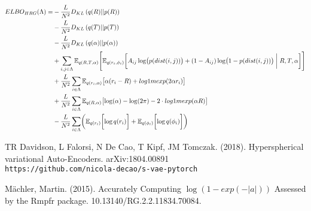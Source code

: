 \documentclass{article}
\newcommand{\E}{\mathbb{E}}
\begin{document}
\begin{equation}
\begin{split}
ELBO_{HRG}(\Lambda) = &- \frac{L}{N^2} D_{KL} \left(q(R)||p(R)\right)\\
\quad &- \frac{L}{N^2} D_{KL} \left(q(T)||p(T)\right)\\
\quad &- \frac{L}{N^2} D_{KL} \left(q(\alpha)||p(\alpha)\right)\\
\quad & + \sum_{i,j \in \Lambda }\E_{q( R,T,\alpha)} \Biggl[ 
\E_{q(r_i, \phi_i)} \biggl[ 
A_{ij} \log \bigl(p(dist(i,j))\bigr) + (1-A_{ij}) \log \bigl(1 - p(dist(i,j))\bigr)  \biggm\vert R,T,\alpha \biggr] \Biggr]\\
\quad &+ \frac{L}{N^2} \sum_{i \in \Lambda} \E_{q(r_i, \alpha)} \bigl[ \alpha (r_i-R) + log1mexp (2 \alpha r_i) \bigr]\\
\quad &+ \frac{L}{N^2} \sum_{i \in \Lambda} \E_{q(R, \alpha)} \bigl[ \log( \alpha ) - \log(2\pi) - 2\cdot log1mexp (\alpha R) \bigr]\\
\quad &- \frac{L}{N^2} \sum_{i \in \Lambda} \biggl(\E_{q(r_i)} \biggl[\log q(r_i) \biggr] + \E_{q(\phi_i)} \biggl[\log q(\phi_i) \biggr] \biggr) 
\end{split}
\end{equation} 

\begin{thebibliography}{}
	TR Davidson, L Falorsi, N De Cao, T Kipf, JM Tomczak. (2018). Hyperspherical variational Auto-Encoders. arXiv:1804.00891 \\
	\texttt{https://github.com/nicola-decao/s-vae-pytorch}
	
	M\"achler, Martin. (2015). Accurately Computing $\log(1 - exp(-|a|))$ Assessed by the Rmpfr package. 10.13140/RG.2.2.11834.70084. 	
	
	
\end{thebibliography}
\end{document}
